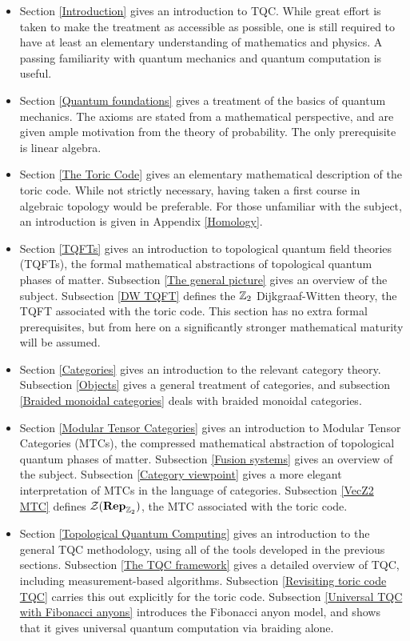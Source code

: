 \documentclass{article}
\theoremstyle{definition}
\numberwithin{figure}{section}
\begin{document}
\begin{itemize}
\item Section \ref{Introduction} gives an introduction to TQC. While great effort is taken to make the treatment as accessible as possible, one is still required to have at least an elementary understanding of mathematics and physics. A passing familiarity with quantum mechanics and quantum computation is useful.

\item Section \ref{Quantum foundations} gives a treatment of the basics of quantum mechanics. The axioms are stated from a mathematical perspective, and are given ample motivation from the theory of probability. The only prerequisite is linear algebra.

\item Section \ref{The Toric Code} gives an elementary mathematical description of the toric code. While not strictly necessary, having taken a first course in algebraic topology would be preferable. For those unfamiliar with the subject, an introduction is given in Appendix \ref{Homology}. 

\item Section \ref{TQFTs} gives an introduction to topological quantum field theories (TQFTs), the formal mathematical abstractions of topological quantum phases of matter. Subsection \ref{The general picture} gives an overview of the subject. Subsection \ref{DW TQFT} defines the $\mathbb{Z}_2$ Dijkgraaf-Witten theory, the TQFT associated with the toric code. This section has no extra formal prerequisites, but from here on a significantly stronger mathematical maturity will be assumed.

\item Section \ref{Categories} gives an introduction to the relevant category theory. Subsection \ref{Objects} gives a general treatment of categories, and subsection \ref{Braided monoidal categories} deals with braided monoidal categories.

\item Section \ref{Modular Tensor Categories} gives an introduction to Modular Tensor Categories (MTCs), the compressed mathematical abstraction of topological quantum phases of matter. Subsection \ref{Fusion systems} gives an overview of the subject. Subsection \ref{Category viewpoint} gives a more elegant interpretation of MTCs in the language of categories. Subsection \ref{VecZ2 MTC} defines $\mathcal{Z}(\bold{Rep}_{\mathbb{Z}_2})$, the MTC associated with the toric code.

\item Section \ref{Topological Quantum Computing} gives an introduction to the general TQC methodology, using all of the tools developed in the previous sections. Subsection \ref{The TQC framework} gives a detailed overview of TQC, including measurement-based algorithms. Subsection \ref{Revisiting toric code TQC} carries this out explicitly for the toric code. Subsection \ref{Universal TQC with Fibonacci anyons} introduces the Fibonacci anyon model, and shows that it gives universal quantum computation via braiding alone.

\end{itemize}
\end{document}
